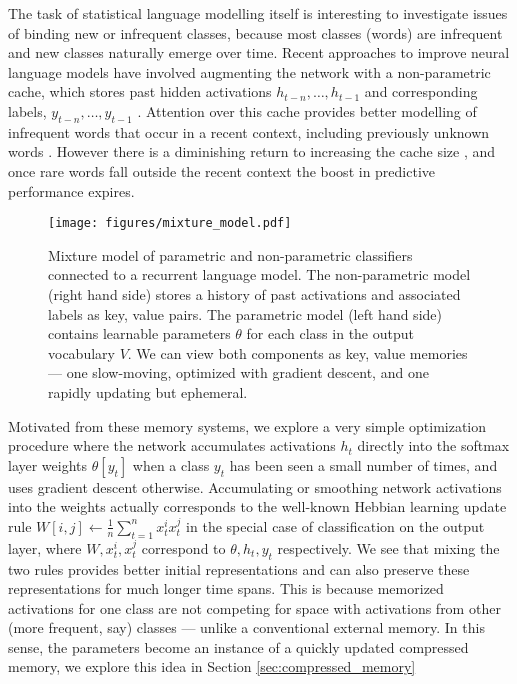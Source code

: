 \documentclass{article} \usepackage{hyperref}
\begin{document}
The task of statistical language modelling itself is interesting to investigate issues of binding new or infrequent classes, because most classes (words) are infrequent \citep{zipf1935psychology} and new classes naturally emerge over time. Recent approaches to improve neural language models have involved augmenting the network with a non-parametric cache, which stores past hidden activations $h_{t-n}, \ldots , h_{t-1}$ and corresponding labels, $y_{t-n}, \ldots, y_{t-1}$ \citep{vinyals2015pointer, merity2016pointer, grave2016improving, kawakami2017learning, grave2017unbounded}. Attention over this cache provides better modelling of infrequent words that occur in a recent context, including previously unknown words \citep{gulcehre2016pointing}. However there is a diminishing return to increasing the cache size \citep{grave2016improving}, and once rare words fall outside the recent context the boost in predictive performance expires.

\begin{figure}
    \centering
    \texttt{[image: figures/mixture\_model.pdf]}
    \caption{Mixture model of parametric and non-parametric classifiers connected to a recurrent language model. The non-parametric model (right hand side) stores a history of past activations and associated labels as key, value pairs. The parametric model (left hand side) contains learnable parameters $\theta$ for each class in the output vocabulary $V$. We can view both components as key, value memories --- one slow-moving, optimized with gradient descent, and one rapidly updating but ephemeral.}
    \label{fig:mixture}
\end{figure}

Motivated from these memory systems, we explore a very simple optimization procedure where the network accumulates activations $h_t$ directly into the softmax layer weights $\theta[y_t]$ when a class $y_t$ has been seen a small number of times, and uses gradient descent otherwise. Accumulating or smoothing network activations into the weights actually corresponds to the well-known Hebbian learning update rule $W[i, j] \leftarrow \frac{1}{n} \sum_{t = 1}^n x_t^i x_t^j$  \citep{hebb1949organization} in the special case of classification on the output layer, where $W, x_t^i, x_t^j$ correspond to $\theta, h_t, y_t$ respectively. We see that mixing the two rules provides better initial representations and can also preserve these representations for much longer time spans. This is because memorized activations for one class are not competing for space with activations from other (more frequent, say) classes --- unlike a conventional external memory. In this sense, the parameters become an instance of a quickly updated compressed memory, we explore this idea in Section \ref{sec:compressed_memory}
\end{document}
